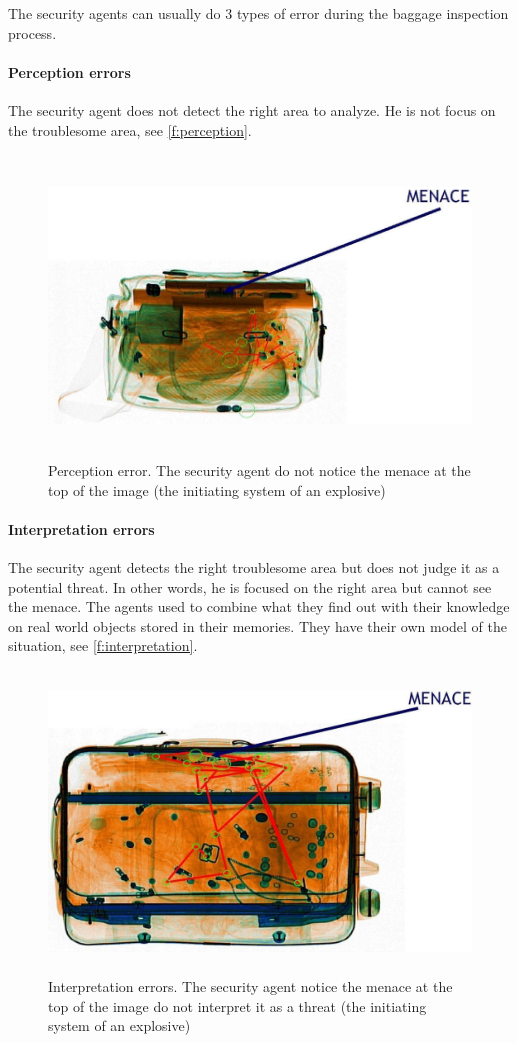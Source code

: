 The security agents can usually do 3 types of error during the baggage inspection process.

\paragraph{Perception errors}

The security agent does not detect the right area to analyze. He is not focus on the troublesome area, see  \autoref{f:perception}.
\begin{figure}
\centering
	\includegraphics[height=8cm]{Figures/perceptionError}
	\caption{Perception error. The security agent do not notice the menace at the top of the image (the initiating system of an explosive) }
	\label{f:perception}
\end{figure}
\paragraph{Interpretation errors}

The security agent detects the right troublesome area but does not judge it as a potential threat. In other words, he is focused on the right area but cannot see the menace. The agents used to combine what they find out with their knowledge on real world objects stored in their memories. They have their own model of the situation, see  \autoref{f:interpretation}.
\begin{figure}
\centering
	\includegraphics[height=8cm]{Figures/interpretationError}
	\caption{Interpretation errors. The security agent notice the menace at the top of the image do not interpret it as a threat (the initiating system of an explosive)}
	\label{f:interpretation}
\end{figure}

